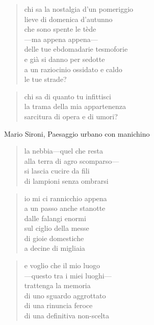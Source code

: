 	\begin{verse}
		chi sa la nostalgia d'un pomeriggio\\
		lieve di domenica d'autunno\\
		che sono spente le tède\\
		—ma appena appena—\\
		delle tue ebdomadarie tesmoforie\\
		e già si danno per sedotte\\
		a un raziocinio ossidato e caldo\\
		le tue strade?
	\end{verse}

	\begin{verse}
		chi sa di quanto tu infittisci\\
		la trama della mia appartenenza\\
		sarcitura di opera e di umori?
	\end{verse}

\clearpage


\begin{artItem}
	Mario Sironi, Paesaggio urbano con manichino
\end{artItem}

	\begin{verse}
		la nebbia—quel che resta\\
		alla terra di agro scomparso—\\
		si lascia cucire da fili\\
		di lampioni senza ombrarsi
	\end{verse}

	\begin{verse}
		io mi ci rannicchio appena\\
		a un passo anche stanotte\\
		dalle falangi enormi\\
		sul ciglio della messe\\
		di gioie domestiche\\
		a decine di migliaia
	\end{verse}

	\begin{verse}
		e voglio che il mio luogo\\
		—questo tra i miei luoghi—\\
		trattenga la memoria\\
		di uno sguardo aggrottato\\
		di una rinuncia feroce\\
		di una definitiva non-scelta
	\end{verse}

